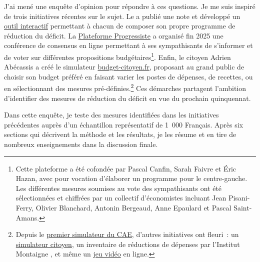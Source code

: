\documentclass[12pt,french]{article}
\begin{document}
J'ai mené une enquête d'opinion pour répondre à ces questions. Je me suis inspiré de trois initiatives récentes sur le sujet. Le \cite{CAE2025} a publié une note et développé un \href{https://simulateur-budgetaire.netlify.app/}{outil interactif} 
permettant à chacun de composer son propre programme de réduction du déficit. La \href{https://laplateformeprogressiste.org/wp-content/uploads/2025/12/20251210_Resultats-par-mesure-1.pdf}{Plateforme Progressiste} a organisé fin 2025 une conférence de consensus en ligne permettant à ses sympathisants de s'informer et de voter sur différentes propositions budgétaires\footnote{Cette plateforme a été cofondée par Pascal Canfin, Sarah Faivre et Éric Hazan, avec pour vocation d'élaborer un programme pour le centre-gauche. Les différentes mesures soumises au vote des sympathisants ont été sélectionnées et chiffrées par un collectif d'économistes incluant Jean Pisani-Ferry, Olivier Blanchard, Antonin Bergeaud, Anne Epaulard et Pascal Saint-Amans.}. Enfin, le citoyen Adrien Abécassis a créé le simulateur \href{https://budget-citoyen.fr}{budget-citoyen.fr}, proposant au grand public de choisir son budget préféré en faisant varier les postes de dépenses, de recettes, ou en sélectionnant des mesures pré-définies.\footnote{Depuis le \href{https://claude.ai/public/artifacts/74cd0701-a4f0-499e-a409-cae1da524ee4}{premier simulateur du CAE}, d'autres initiatives ont fleuri~: un \href{https://monbudgetpourlafrance.fr/}{simulateur citoyen}, un inventaire de réductions de dépenses par l'Institut Montaigne \citep{bourquard_2024}, et même un \href{https://labatailledubudget.netlify.app/}{jeu vidéo} en ligne.} Ces démarches partagent l'ambition d'identifier des mesures de réduction du déficit en vue du prochain quinquennat.

Dans cette enquête, je teste des mesures identifiées dans les initiatives précédentes auprès d'un échantillon représentatif de 1~000 Français. %
Après six sections qui décrivent la méthode et les résultats, je les résume et en tire de nombreux enseignements dans la discussion finale.
\end{document}
